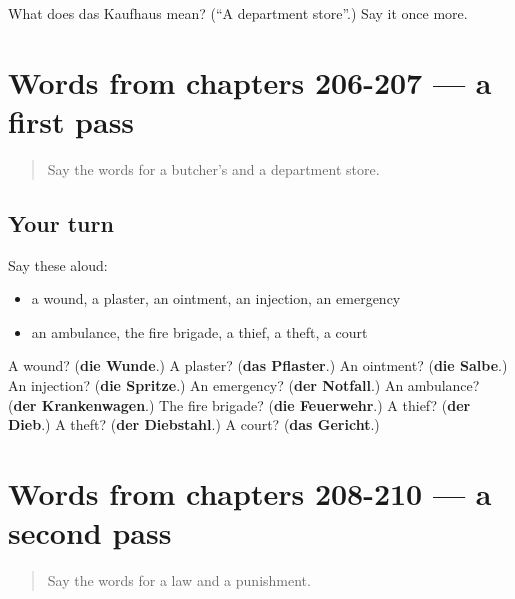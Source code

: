\begin{tcolorbox}[breakable,colback=teal!4,colframe=teal!35!black,title={Before you move on}]
What does das Kaufhaus mean? (\textquotedblleft{}A department store\textquotedblright{}.) Say it once more.
\end{tcolorbox}
\section[(dialogue)]{Words from chapters 206-207 — a first pass}

\label{lesson:GE-R210-first-pass-words-from-chapters-206-207}



\begin{quote}
Say the words for a butcher's and a department store.
\end{quote}

\subsection*{Your turn}
Say these aloud:

\begin{itemize}
\raggedright
  \item a wound, a plaster, an ointment, an injection, an emergency
  \item an ambulance, the fire brigade, a thief, a theft, a court
\end{itemize}

\begin{tcolorbox}[breakable,colback=teal!4,colframe=teal!35!black,title={Before you move on}]
A wound? (\textbf{die Wunde}.) A plaster? (\textbf{das Pflaster}.) An ointment? (\textbf{die Salbe}.) An injection? (\textbf{die Spritze}.) An emergency? (\textbf{der Notfall}.) An ambulance? (\textbf{der Krankenwagen}.) The fire brigade? (\textbf{die Feuerwehr}.) A thief? (\textbf{der Dieb}.) A theft? (\textbf{der Diebstahl}.) A court? (\textbf{das Gericht}.)
\end{tcolorbox}
\section[(dialogue)]{Words from chapters 208-210 — a second pass}

\label{lesson:GE-R210-second-pass-words-from-chapters-208-210}



\begin{quote}
Say the words for a law and a punishment.
\end{quote}

